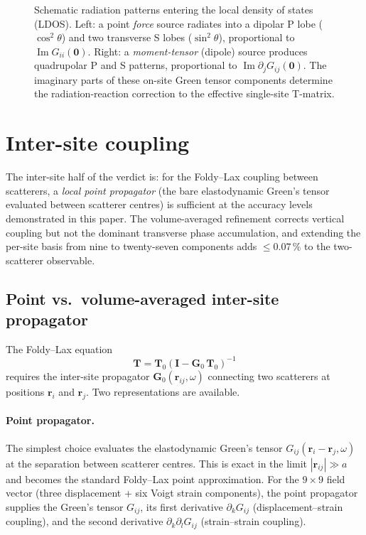 \documentclass[11pt,a4paper]{article}
\theoremstyle{plain}
\theoremstyle{definition}
\theoremstyle{remark}
\begin{document}
\begin{figure}[h]
\centering

\caption{%
  Schematic radiation patterns entering the local density of states (LDOS).
  Left: a point \emph{force} source radiates into a dipolar P lobe
  ($\cos^2\!\theta$) and two transverse S lobes ($\sin^2\!\theta$),
  proportional to $\operatorname{Im} G_{ii}(\mathbf{0})$.
  Right: a \emph{moment-tensor} (dipole) source produces quadrupolar P and S
  patterns, proportional to $\operatorname{Im} \partial_j G_{ij}(\mathbf{0})$.
  The imaginary parts of these on-site Green tensor components determine
  the radiation-reaction correction to the effective single-site T-matrix.%
}
\label{fig:ldos}
\end{figure}

\section{Inter-site coupling}\label{sec:inter}

The inter-site half of the verdict is: for the Foldy--Lax coupling between
scatterers, a \emph{local point propagator} (the bare elastodynamic Green's
tensor evaluated between scatterer centres) is sufficient at the accuracy
levels demonstrated in this paper.  The volume-averaged refinement corrects
vertical coupling but not the dominant transverse phase accumulation, and
extending the per-site basis from nine to twenty-seven components adds
$\le 0.07\,\%$ to the two-scatterer observable.

\subsection{Point vs.\ volume-averaged inter-site propagator}
\label{sec:inter-point-vs-va}

The Foldy--Lax equation \cite{foldy1945,lax1951}
\begin{equation}
  \mathbf{T} = \mathbf{T}_0(\mathbf{I} - \mathbf{G}_0\,\mathbf{T}_0)^{-1}
  \label{eq:fl-inter}
\end{equation}
requires the inter-site propagator $\mathbf{G}_0(\mathbf{r}_{ij},\omega)$
connecting two scatterers at positions $\mathbf{r}_i$ and $\mathbf{r}_j$.
Two representations are available.

\paragraph{Point propagator.}
The simplest choice evaluates the elastodynamic Green's tensor
$G_{ij}(\mathbf{r}_i - \mathbf{r}_j, \omega)$ at the separation
between scatterer centres.  This is exact in the limit $|\mathbf{r}_{ij}|
\gg a$ and becomes the standard Foldy--Lax point approximation.  For the
$9\times9$ field vector (three displacement + six Voigt strain components),
the point propagator supplies the Green's tensor $G_{ij}$, its first
derivative $\partial_k G_{ij}$ (displacement--strain coupling), and the
second derivative $\partial_k\partial_l G_{ij}$ (strain--strain coupling).
\end{document}
